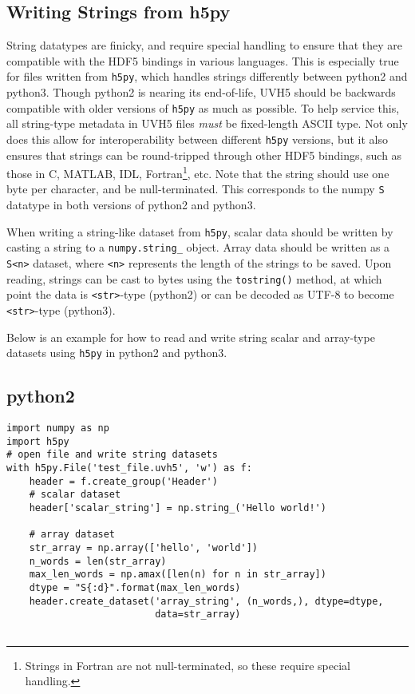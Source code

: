\documentclass[11pt, oneside]{article}
\begin{document}
\begin{appendices}
\section{Writing Strings from h5py}
\label{appendix:strings}
String datatypes are finicky, and require special handling to ensure that they
are compatible with the HDF5 bindings in various languages. This is especially
true for files written from \verb+h5py+, which handles strings differently
between python2 and python3. Though python2 is nearing its end-of-life, UVH5
should be backwards compatible with older versions of \verb+h5py+ as much as
possible. To help service this, all string-type metadata in UVH5 files
\textit{must} be fixed-length ASCII type. Not only does this allow for
interoperability between different \verb+h5py+ versions, but it also ensures
that strings can be round-tripped through other HDF5 bindings, such as those in
C, MATLAB, IDL, Fortran\footnote{Strings in Fortran are not null-terminated, so
  these require special handling.}, etc. Note that the string should use one
byte per character, and be null-terminated. This corresponds to the numpy
\verb+S+ datatype in both versions of python2 and python3.

When writing a string-like dataset from \verb+h5py+, scalar data should be
written by casting a string to a \verb+numpy.string_+ object. Array data should
be written as a \verb+S<n>+ dataset, where \verb+<n>+ represents the length of
the strings to be saved. Upon reading, strings can be cast to bytes using the
\verb+tostring()+ method, at which point the data is \verb+<str>+-type (python2)
or can be decoded as UTF-8 to become \verb+<str>+-type (python3).

Below is an example for how to read and write string scalar and array-type
datasets using \verb+h5py+ in python2 and python3.

\subsection{python2}
\begin{verbatim}
import numpy as np
import h5py
# open file and write string datasets
with h5py.File('test_file.uvh5', 'w') as f:
    header = f.create_group('Header')
    # scalar dataset
    header['scalar_string'] = np.string_('Hello world!')

    # array dataset
    str_array = np.array(['hello', 'world'])
    n_words = len(str_array)
    max_len_words = np.amax([len(n) for n in str_array])
    dtype = "S{:d}".format(max_len_words)
    header.create_dataset('array_string', (n_words,), dtype=dtype,
                          data=str_array)


\end{verbatim}
\end{appendices}
\end{document}
